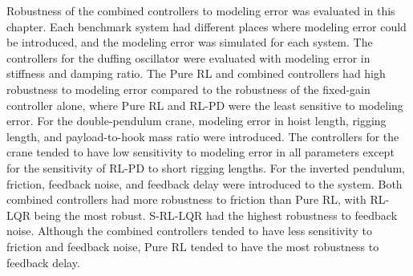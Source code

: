 Robustness of the combined controllers to modeling error was evaluated in this chapter. Each benchmark system had different places where modeling error could be introduced, and the modeling error was simulated for each system. The controllers for the duffing oscillator were evaluated with modeling error in stiffness and damping ratio. The Pure RL and combined controllers had high robustness to modeling error compared to the robustness of the fixed-gain controller alone, where Pure RL and RL-PD were the least sensitive to modeling error. For the double-pendulum crane, modeling error in hoist length, rigging length, and payload-to-hook mass ratio were introduced. The controllers for the crane tended to have low sensitivity to modeling error in all parameters except for the sensitivity of RL-PD to short rigging lengths. For the inverted pendulum, friction, feedback noise, and feedback delay were introduced to the system. Both combined controllers had more robustness to friction than Pure RL, with RL-LQR being the most robust. S-RL-LQR had the highest robustness to feedback noise. Although the combined controllers tended to have less sensitivity to friction and feedback noise, Pure RL tended to have the most robustness to feedback delay.


